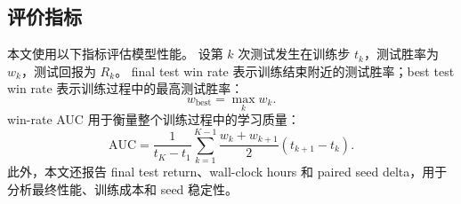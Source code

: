 \subsection{评价指标}

本文使用以下指标评估模型性能。
设第 \(k\) 次测试发生在训练步 \(t_k\)，测试胜率为 \(w_k\)，测试回报为 \(R_k\)。
final test win rate 表示训练结束附近的测试胜率；best test win rate 表示训练过程中的最高测试胜率：
\begin{equation}
  w_{\mathrm{best}} = \max_k w_k.
\end{equation}
win-rate AUC 用于衡量整个训练过程中的学习质量：
\begin{equation}
  \mathrm{AUC}
  =
  \frac{1}{t_K-t_1}
  \sum_{k=1}^{K-1}
  \frac{w_k+w_{k+1}}{2}
  (t_{k+1}-t_k).
\end{equation}
此外，本文还报告 final test return、wall-clock hours 和 paired seed delta，用于分析最终性能、训练成本和 seed 稳定性。

